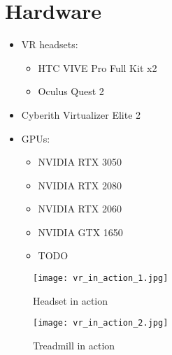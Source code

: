 \newpage
\section{Hardware}
\label{sec:hardware}
\begin{itemize}
    \item VR headsets:
    \begin{itemize}
        \item HTC VIVE Pro Full Kit x2\\ %
        \item Oculus Quest 2\\
    \end{itemize}
    \item Cyberith Virtualizer Elite 2\\
    \item GPUs:
    \begin{itemize}
        \item NVIDIA RTX 3050\\
        \item NVIDIA RTX 2080\\
        \item NVIDIA RTX 2060\\
        \item NVIDIA GTX 1650\\
        \item TODO\\%
    \end{itemize}
\end{itemize}
  
\begin{figure} %
  \texttt{[image: vr\_in\_action\_1.jpg]}
  \caption{Headset in action}
\end{figure}
\begin{figure}
  \texttt{[image: vr\_in\_action\_2.jpg]}
  \caption{Treadmill in action}
\end{figure}